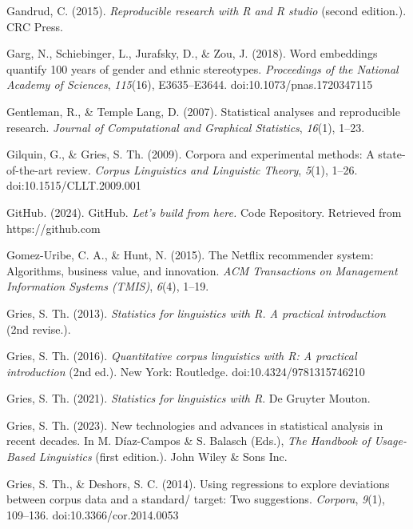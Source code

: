 \documentclass[
  letterpaper,
  krantz1]{latex/krantz-mod}
\newlength{\cslhangindent}
\newenvironment{CSLReferences}[2] %
 {\begin{list}{}{%
  \setlength{\itemindent}{0pt}
  \setlength{\leftmargin}{0pt}
  \setlength{\parsep}{0pt}
  \ifodd #1
   \setlength{\leftmargin}{\cslhangindent}
   \setlength{\itemindent}{-1\cslhangindent}
  \fi
  \setlength{\itemsep}{#2\baselineskip}}}
 {\end{list}}
\theoremstyle{definition}
\theoremstyle{definition}
\theoremstyle{remark}
\begin{document}
\begin{CSLReferences}{1}{0}
Gandrud, C. (2015). \emph{Reproducible research with {R} and {R} studio}
(second edition.). CRC Press.

Garg, N., Schiebinger, L., Jurafsky, D., \& Zou, J. (2018). Word
embeddings quantify 100 years of gender and ethnic stereotypes.
\emph{Proceedings of the National Academy of Sciences}, \emph{115}(16),
E3635--E3644. doi:10.1073/pnas.1720347115

Gentleman, R., \& Temple Lang, D. (2007). Statistical analyses and
reproducible research. \emph{Journal of Computational and Graphical
Statistics}, \emph{16}(1), 1--23.

Gilquin, G., \& Gries, S. Th. (2009). Corpora and experimental methods:
A state-of-the-art review. \emph{Corpus Linguistics and Linguistic
Theory}, \emph{5}(1), 1--26. doi:10.1515/CLLT.2009.001

GitHub. (2024). {GitHub}. \emph{Let's build from here.} Code Repository.
Retrieved from https://github.com

Gomez-Uribe, C. A., \& Hunt, N. (2015). The {Netflix} recommender
system: {Algorithms}, business value, and innovation. \emph{ACM
Transactions on Management Information Systems (TMIS)}, \emph{6}(4),
1--19.

Gries, S. Th. (2013). \emph{Statistics for linguistics with {R}. {A}
practical introduction} (2nd revise.).

Gries, S. Th. (2016). \emph{Quantitative corpus linguistics with {R}: A
practical introduction} (2nd ed.). New York: Routledge.
doi:10.4324/9781315746210

Gries, S. Th. (2021). \emph{Statistics for linguistics with {R}}. De
Gruyter Mouton.

Gries, S. Th. (2023). New technologies and advances in statistical
analysis in recent decades. In M. Díaz-Campos \& S. Balasch (Eds.),
\emph{The {Handbook} of {Usage-Based Linguistics}} (first edition.).
John Wiley \& Sons Inc.

Gries, S. Th., \& Deshors, S. C. (2014). Using regressions to explore
deviations between corpus data and a standard/ target: Two suggestions.
\emph{Corpora}, \emph{9}(1), 109--136. doi:10.3366/cor.2014.0053


\end{CSLReferences}
\end{document}
